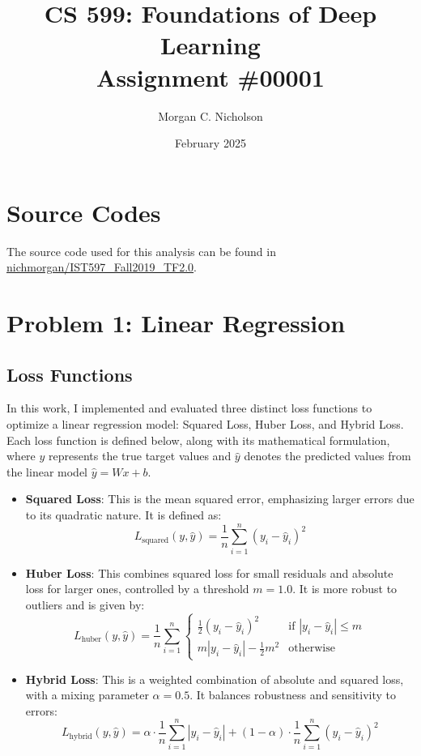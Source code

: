 \documentclass{article}
\title{CS 599: Foundations of Deep Learning\\Assignment \#00001}
\author{Morgan C. Nicholson}
\date{February 2025}
\begin{document}
\maketitle

\section*{Source Codes}
The source code used for this analysis can be found in \href{https://github.com/nichmorgan/IST597_Fall2019_TF2.0/tree/master/Assignment2}{nichmorgan/IST597\_Fall2019\_TF2.0}.

\section{Problem 1: Linear Regression}
\subsection{Loss Functions}

In this work, I implemented and evaluated three distinct loss functions to optimize a linear regression model: Squared Loss, Huber Loss, and Hybrid Loss. Each loss function is defined below, along with its mathematical formulation, where \( y \) represents the true target values and \( \hat{y} \) denotes the predicted values from the linear model \( \hat{y} = Wx + b \).

\begin{itemize}
    \item \textbf{Squared Loss}: This is the mean squared error, emphasizing larger errors due to its quadratic nature. It is defined as:
    \begin{equation}
        L_{\text{squared}}(y, \hat{y}) = \frac{1}{n} \sum_{i=1}^{n} (y_i - \hat{y}_i)^2
    \end{equation}
    
    \item \textbf{Huber Loss}: This combines squared loss for small residuals and absolute loss for larger ones, controlled by a threshold \( m = 1.0 \). It is more robust to outliers and is given by:
    \begin{equation}
        L_{\text{huber}}(y, \hat{y}) = \frac{1}{n} \sum_{i=1}^{n} 
        \begin{cases} 
            \frac{1}{2} (y_i - \hat{y}_i)^2 & \text{if } |y_i - \hat{y}_i| \leq m \\
            m |y_i - \hat{y}_i| - \frac{1}{2} m^2 & \text{otherwise}
        \end{cases}
    \end{equation}
    
    \item \textbf{Hybrid Loss}: This is a weighted combination of absolute and squared loss, with a mixing parameter \( \alpha = 0.5 \). It balances robustness and sensitivity to errors:
    \begin{equation}
        L_{\text{hybrid}}(y, \hat{y}) = \alpha \cdot \frac{1}{n} \sum_{i=1}^{n} |y_i - \hat{y}_i| + (1 - \alpha) \cdot \frac{1}{n} \sum_{i=1}^{n} (y_i - \hat{y}_i)^2
    \end{equation}
\end{itemize}
\end{document}
